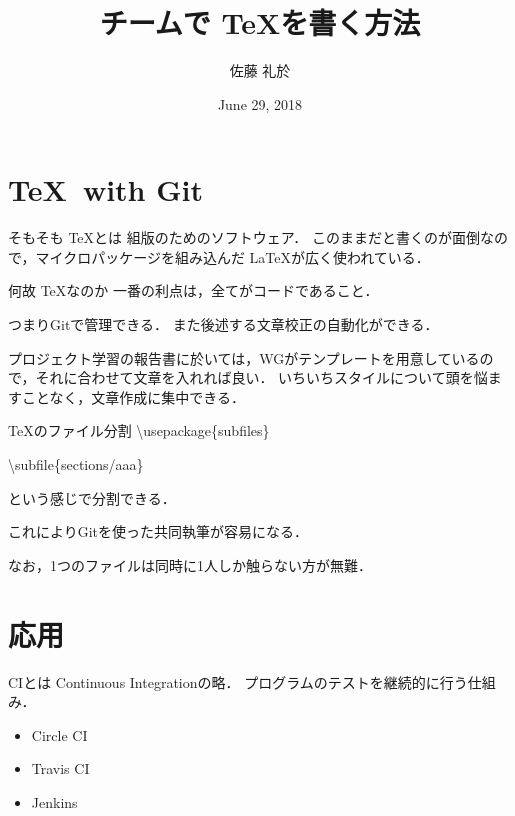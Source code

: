 \documentclass{beamer}
\title{チームで \TeX を書く方法}
\author{佐藤 礼於}
\date{June 29, 2018}
\begin{document}
\maketitle

\section{\TeX \ with Git}

\begin{frame}{そもそも \TeX とは}
  組版のためのソフトウェア．
  このままだと書くのが面倒なので，マイクロパッケージを組み込んだ \LaTeX が広く使われている．
\end{frame}

\begin{frame}{何故 \TeX なのか}
  一番の利点は，全てがコードであること．

  つまりGitで管理できる．
  また後述する文章校正の自動化ができる．

  プロジェクト学習の報告書に於いては，WGがテンプレートを用意しているので，それに合わせて文章を入れれば良い．
  いちいちスタイルについて頭を悩ますことなく，文章作成に集中できる．
\end{frame}

\begin{frame}{\TeX のファイル分割}
  \textbackslash usepackage\{subfiles\}

  \textbackslash subfile\{sections/aaa\}

  という感じで分割できる．

  これによりGitを使った共同執筆が容易になる．

  なお，1つのファイルは同時に1人しか触らない方が無難．
\end{frame}


\section{応用}

\begin{frame}{CIとは}
  Continuous Integrationの略．
  プログラムのテストを継続的に行う仕組み．

  \begin{itemize}
    \item Circle CI
    \item Travis CI
    \item Jenkins
  \end{itemize}
\end{frame}
\end{document}
